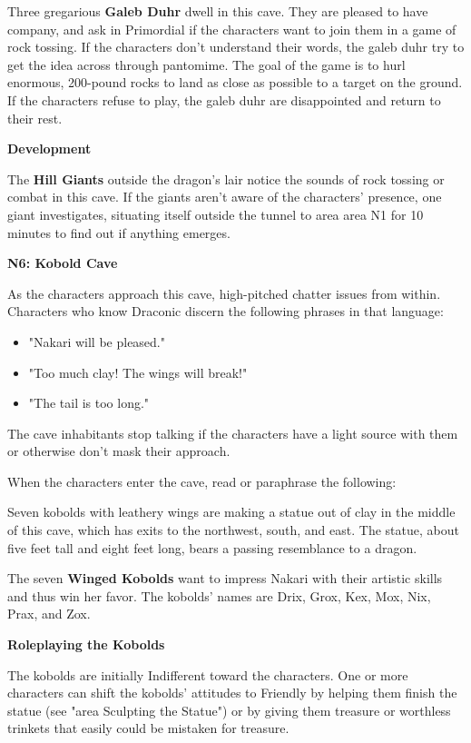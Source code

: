 \documentclass[letterpaper, 11pt, twocolumn]{dndbook}
\begin{document}
Three gregarious \textbf{Galeb Duhr} dwell in this cave. They are pleased to have company, and ask in Primordial if the characters want to join them in a game of rock tossing. If the characters don't understand their words, the galeb duhr try to get the idea across through pantomime. The goal of the game is to hurl enormous, 200-pound rocks to land as close as possible to a target on the ground. If the characters refuse to play, the galeb duhr are disappointed and return to their rest.

\textbf{Development}

The \textbf{Hill Giants} outside the dragon's lair notice the sounds of rock tossing or combat in this cave. If the giants aren't aware of the characters' presence, one giant investigates, situating itself outside the tunnel to area area N1 for 10 minutes to find out if anything emerges.

\textbf{N6: Kobold Cave}

As the characters approach this cave, high-pitched chatter issues from within. Characters who know Draconic discern the following phrases in that language:

\begin{itemize}
\item "Nakari will be pleased."
\item "Too much clay! The wings will break!"
\item "The tail is too long."
\end{itemize}

The cave inhabitants stop talking if the characters have a light source with them or otherwise don't mask their approach.

When the characters enter the cave, read or paraphrase the following:

\begin{DndReadAloud}
Seven kobolds with leathery wings are making a statue out of clay in the middle of this cave, which has exits to the northwest, south, and east. The statue, about five feet tall and eight feet long, bears a passing resemblance to a dragon.
\end{DndReadAloud}

The seven \textbf{Winged Kobolds} want to impress Nakari with their artistic skills and thus win her favor. The kobolds' names are Drix, Grox, Kex, Mox, Nix, Prax, and Zox.

\textbf{Roleplaying the Kobolds}

The kobolds are initially Indifferent toward the characters. One or more characters can shift the kobolds' attitudes to Friendly by helping them finish the statue (see "area Sculpting the Statue") or by giving them treasure or worthless trinkets that easily could be mistaken for treasure.
\end{document}
